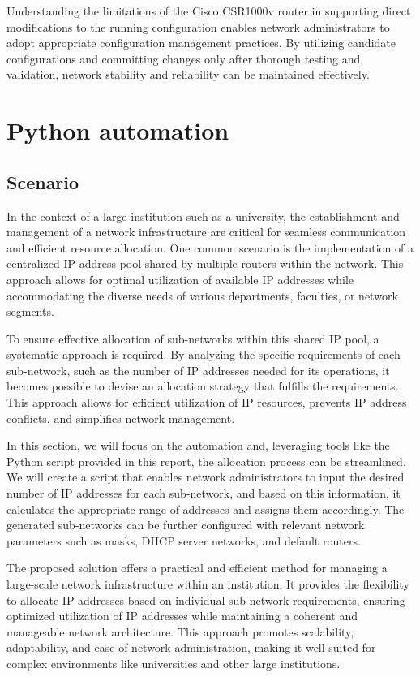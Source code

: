Understanding the limitations of the Cisco CSR1000v router in supporting direct modifications to the running configuration enables network administrators to adopt appropriate configuration management practices. By utilizing candidate configurations and committing changes only after thorough testing and validation, network stability and reliability can be maintained effectively.

\section{Python automation}
\subsection{Scenario}

In the context of a large institution such as a university, the establishment and management of a network infrastructure are critical for seamless communication and efficient resource allocation. One common scenario is the implementation of a centralized IP address pool shared by multiple routers within the network. This approach allows for optimal utilization of available IP addresses while accommodating the diverse needs of various departments, faculties, or network segments.

To ensure effective allocation of sub-networks within this shared IP pool, a systematic approach is required. By analyzing the specific requirements of each sub-network, such as the number of IP addresses needed for its operations, it becomes possible to devise an allocation strategy that fulfills the requirements. This approach allows for efficient utilization of IP resources, prevents IP address conflicts, and simplifies network management.

In this section, we will focus on the automation and, leveraging tools like the Python script provided in this report, the  allocation process can be streamlined. We will create a script that enables network administrators to input the desired number of IP addresses for each sub-network, and based on this information, it calculates the appropriate range of addresses and assigns them accordingly. The generated sub-networks can be further configured with relevant network parameters such as masks, DHCP server networks, and default routers.

The proposed solution offers a practical and efficient method for managing a large-scale network infrastructure within an institution. It provides the flexibility to allocate IP addresses based on individual sub-network requirements, ensuring optimized utilization of IP addresses while maintaining a coherent and manageable network architecture. This approach promotes scalability, adaptability, and ease of network administration, making it well-suited for complex environments like universities and other large institutions.

